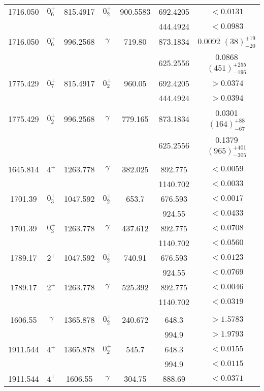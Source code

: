\begin{longtable}{>{\footnotesize}c|>{\footnotesize}c|>{\footnotesize}c|>{\footnotesize}c|>{\footnotesize}c|>{\footnotesize}c|>{\footnotesize}c}
        1716.050 & $0^+_6$ & 815.4917 & $0^+_2$ & 900.5583 &  692.4205 & $<0.0131$  \\ 
        &  & & &  & 444.4924 & $<0.0983$   \\ \hline
        1716.050 & $0^+_6$ & 996.2568 & $\gamma$ & 719.80 & 873.1834 & 0.0092 $(38)_{-20}^{+19}$  \\ 
        &  & & &  & 625.2556 & 0.0868 $(451)_{-196}^{+255}$  \\ \hline
        1775.429 & $0^+_7$ & 815.4917 & $0^+_2$ & 960.05 &  692.4205 & $>0.0374$   \\
        &  &  & & & 444.4924 & $>0.0394$  \\ \hline
        1775.429 & $0^+_2$ & 996.2568 & $\gamma$ & 779.165 & 873.1834 & 0.0301 $(164)_{-67}^{+88}$  \\
        &  &  & & & 625.2556 & 0.1379 $(965)_{-305}^{+401}$  \\ \hline
        \multicolumn{7}{l}{$4^+\rightarrow 4^+$} 	\\ \hline
        1645.814 & $4^+$ & 1263.778 & $\gamma$ & 382.025 & 892.775 & $<0.0059$  \\
         &  &  & & & 1140.702 & $<0.0033$  \\ \hline
        1701.39 & $0^+_3$ & 1047.592 & $0^+_2$ & 653.7 & 676.593 & $<0.0017$  \\
         &  &  & & & 924.55 & $<0.0433$  \\ \hline
        1701.39 & $0^+_3$ & 1263.778 & $\gamma$ & 437.612 & 892.775 & $<0.0708$  \\
         &  &  & & & 1140.702 & $<0.0560$  \\ \hline
        1789.17 &  $2^+$ & 1047.592 & $0^+_2$ & 740.91 & 676.593 & $<0.0123$  \\
         &  &  & & & 924.55 & $<0.0769$  \\ \hline
        1789.17 &  $2^+$ & 1263.778 & $\gamma$ & 525.392 & 892.775 & $<0.0046$  \\
         &  &  & & & 1140.702 & $<0.0319$  \\ \hline
        \multicolumn{7}{l}{$6^+\rightarrow 6^+$} 	\\ \hline
        1606.55 & $\gamma$ & 1365.878 & $0^+_2$ & 240.672 & 648.3 &  $>1.5783$ \\
        &  & & &  & 994.9 &  $>1.9793$   \\ \hline
        1911.544 & $4^+$ & 1365.878 & $0^+_2$ & 545.7 & 648.3 &  $<0.0155$ \\
        &  & & &  & 994.9 &  $<0.0115$   \\ \hline
        1911.544 & $4^+$ & 1606.55 & $\gamma$ & 304.75 & 888.69 & $<0.0371$  \\
        \bottomrule
	\end{longtable}
